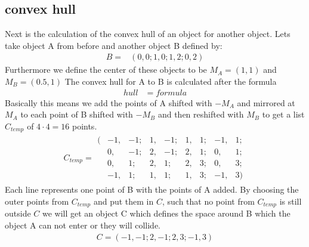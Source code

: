 \subsection{convex hull} %
Next is the calculation of the convex hull of an object for another object. Lets take object A from before and another object B defined by:
\begin{align*}
B = 	&( 0 , 0 ;1 , 0 ;1, 2; 0, 2)	
\end{align*}
Furthermore we define the center of these objects to be $M_A = (1,1)$ and $M_B = (0.5 , 1)$
The convex hull for A to B is calculated after the formula
\begin{align*}
	hull &= formula
\end{align*}
Basically this means we add the points of A shifted with $-M_A$ and mirrored at $M_A$ to each point of B shifted with $-M_B$ and then reshifted with $M_B$ to get a list $C_{temp}$ of $4\cdot 4 = 16$  points.
\begin{align*}
C_{temp} =	\begin{matrix}
		(&-1, &-1; &1, &-1; &1, &1; &-1, &1;\\
		&0, &-1; &2, &-1; &2, &1; &0, &1;\\
		&0, &1; &2, &1; &2, &3; &0, &3;\\
		&-1, &1; &1, &1; &1, &3; &-1, &3)
		\end{matrix}
\end{align*}
Each line represents one point of B with the points of A added. By choosing the outer points from $C_{temp}$ and put them in $C$, such that no point from $C_{temp}$ is still outside $C$  we will get an object C which defines the space around B which the object A can not enter or they will collide.
\begin{align*}
C = (-1,-1; 2, -1; 2 ,3; -1, 3)
\end{align*}
